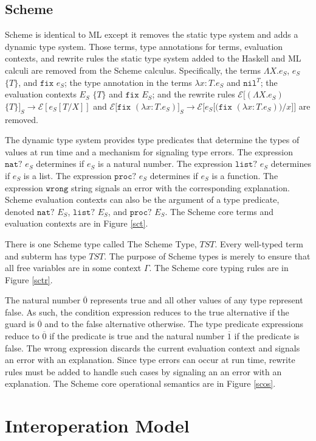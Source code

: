 



\subsection{Scheme}

Scheme is identical to ML except it removes the static type system and adds a dynamic type system.  Those terms, type annotations for terms, evaluation contexts, and rewrite rules the static type system added to the Haskell and ML calculi are removed from the Scheme calculus.  Specifically, the terms $\Lambda X.e_{S}$, $e_{S}$ $\lbrace T\rbrace$, and $\mathtt{fix}$ $e_{S}$; the type annotation in the terms $\lambda x:T.e_{S}$ and $\mathtt{nil}^{T}$; the evaluation contexts $E_{S}$ $\lbrace T\rbrace$ and $\mathtt{fix}$ $E_{S}$; and the rewrite rules $\mathscr{E}[(\Lambda X.e_{S})$ $\lbrace T\rbrace]_{S}\rightarrow\mathscr{E}[e_{S}[T/X]]$ and $\mathscr{E}[\mathtt{fix}$ $(\lambda x:T.e_{S})]_{S}\rightarrow\mathscr{E}[e_{S}[(\mathtt{fix}$ $(\lambda x:T.e_{S}))/x]]$ are removed.

The dynamic type system provides type predicates that determine the types of values at run time and a mechanism for signaling type errors.  The expression $\mathtt{nat?}$ $e_{S}$ determines if $e_{S}$ is a natural number.  The expression $\mathtt{list?}$ $e_{S}$ determines if $e_{S}$ is a list.  The expression $\mathtt{proc?}$ $e_{S}$ determines if $e_{S}$ is a function.  The expression $\mathtt{wrong}$ string signals an error with the corresponding explanation.  Scheme evaluation contexts can also be the argument of a type predicate, denoted $\mathtt{nat?}$ $E_{S}$, $\mathtt{list?}$ $E_{S}$, and $\mathtt{proc?}$ $E_{S}$.  The Scheme core terms and evaluation contexts are in Figure \ref{sct}.



There is one Scheme type called The Scheme Type, $TST$.  Every well-typed term and subterm has type $TST$.  The purpose of Scheme types is merely to ensure that all free variables are in some context $\Gamma$.  The Scheme core typing rules are in Figure \ref{sctr}.



The natural number $\overline{0}$ represents true and all other values of any type represent false.  As such, the condition expression reduces to the true alternative if the guard is $\overline{0}$ and to the false alternative otherwise.  The type predicate expressions reduce to $\overline{0}$ if the predicate is true and the natural number $\overline{1}$ if the predicate is false.  The wrong expression discards the current evaluation context and signals an error with an explanation.  Since type errors can occur at run time, rewrite rules must be added to handle such cases by signaling an an error with an explanation.  The Scheme core operational semantics are in Figure \ref{scos}.



\section{Interoperation Model}

